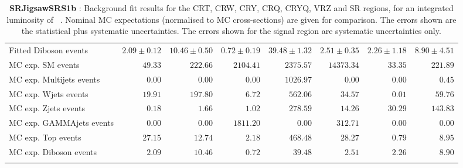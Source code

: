 \begin{table}
\begin{center}
{\begin{tabular*}{\textwidth}{@{\extracolsep{\fill}}lrrrrrrr}
        Fitted Diboson events         & $2.09 \pm 0.12$          & $10.46 \pm 0.50$          & $0.72 \pm 0.19$          & $39.48 \pm 1.32$          & $2.51 \pm 0.35$          & $2.26 \pm 1.18$          & $8.90 \pm 4.51$              \\
 \noalign{\smallskip}\hline\noalign{\smallskip}
MC exp. SM events              & $49.33$          & $222.66$          & $2104.41$          & $2375.57$          & $14373.34$          & $33.35$          & $221.89$              \\
\noalign{\smallskip}\hline\noalign{\smallskip}
        MC exp. Multijets events         & $0.00$          & $0.00$          & $0.00$          & $1026.97$          & $0.00$          & $0.00$          & $0.45$              \\
        MC exp. Wjets events         & $19.91$          & $197.80$          & $6.72$          & $562.06$          & $34.57$          & $0.01$          & $59.76$              \\
        MC exp. Zjets events         & $0.18$          & $1.66$          & $1.02$          & $278.59$          & $14.26$          & $30.29$          & $143.83$              \\
        MC exp. GAMMAjets events         & $0.00$          & $0.00$          & $1811.20$          & $0.00$          & $312.71$          & $0.00$          & $0.00$              \\
        MC exp. Top events         & $27.15$          & $12.74$          & $2.18$          & $468.48$          & $28.27$          & $0.79$          & $8.95$              \\
        MC exp. Diboson events         & $2.09$          & $10.46$          & $0.72$          & $39.48$          & $2.51$          & $2.26$          & $8.90$              \\
\noalign{\smallskip}\hline\noalign{\smallskip}
\end{tabular*}
}
\end{center}
\caption{{\bf SRJigsawSRS1b} : Background fit results for the CRT, CRW, CRY, CRQ, CRYQ, VRZ and SR regions, for an integrated luminosity of \ourintlumi~\ifb. Nominal MC expectations (normalised to MC cross-sections) are given for comparison. The errors shown are the statistical plus systematic uncertainties. The errors shown for the signal region are systematic uncertainties only.}
\label{table.results.systematics.in.logL.fit.CRT.CRW.CRY.CRQ.CRYQ.VRZ.SR.SRJigsawSRS1b}
\end{table}
%